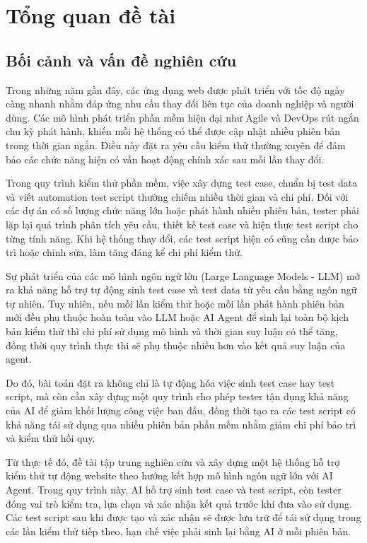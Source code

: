 \chapter{Tổng quan đề tài}
\label{Chapter1}

\section{Bối cảnh và vấn đề nghiên cứu}

Trong những năm gần đây, các ứng dụng web được phát triển với tốc độ ngày càng nhanh nhằm đáp ứng nhu cầu thay đổi liên tục của doanh nghiệp và người dùng. Các mô hình phát triển phần mềm hiện đại như Agile và DevOps rút ngắn chu kỳ phát hành, khiến mỗi hệ thống có thể được cập nhật nhiều phiên bản trong thời gian ngắn. Điều này đặt ra yêu cầu kiểm thử thường xuyên để đảm bảo các chức năng hiện có vẫn hoạt động chính xác sau mỗi lần thay đổi.

Trong quy trình kiểm thử phần mềm, việc xây dựng test case, chuẩn bị test data và viết automation test script thường chiếm nhiều thời gian và chi phí. Đối với các dự án có số lượng chức năng lớn hoặc phát hành nhiều phiên bản, tester phải lặp lại quá trình phân tích yêu cầu, thiết kế test case và hiện thực test script cho từng tính năng. Khi hệ thống thay đổi, các test script hiện có cũng cần được bảo trì hoặc chỉnh sửa, làm tăng đáng kể chi phí kiểm thử.

Sự phát triển của các mô hình ngôn ngữ lớn (Large Language Models - LLM) mở ra khả năng hỗ trợ tự động sinh test case và test data từ yêu cầu bằng ngôn ngữ tự nhiên. Tuy nhiên, nếu mỗi lần kiểm thử hoặc mỗi lần phát hành phiên bản mới đều phụ thuộc hoàn toàn vào LLM hoặc AI Agent để sinh lại toàn bộ kịch bản kiểm thử thì chi phí sử dụng mô hình và thời gian suy luận có thể tăng, đồng thời quy trình thực thi sẽ phụ thuộc nhiều hơn vào kết quả suy luận của agent.

Do đó, bài toán đặt ra không chỉ là tự động hóa việc sinh test case hay test script, mà còn cần xây dựng một quy trình cho phép tester tận dụng khả năng của AI để giảm khối lượng công việc ban đầu, đồng thời tạo ra các test script có khả năng tái sử dụng qua nhiều phiên bản phần mềm nhằm giảm chi phí bảo trì và kiểm thử hồi quy.

Từ thực tế đó, đề tài tập trung nghiên cứu và xây dựng một hệ thống hỗ trợ kiểm thử tự động website theo hướng kết hợp mô hình ngôn ngữ lớn với AI Agent. Trong quy trình này, AI hỗ trợ sinh test case và test script, còn tester đóng vai trò kiểm tra, lựa chọn và xác nhận kết quả trước khi đưa vào sử dụng. Các test script sau khi được tạo và xác nhận sẽ được lưu trữ để tái sử dụng trong các lần kiểm thử tiếp theo, hạn chế việc phải sinh lại bằng AI ở mỗi phiên bản.

